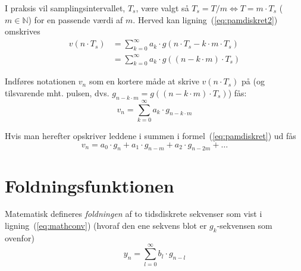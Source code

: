 \documentclass[dvips,11pt,a4paper]{article}
\begin{document}

\noindent{}I praksis vil samplingsintervallet, $T_s$, være valgt så $T_s = T/m \Leftrightarrow{} T = m \cdot T_s$ ($m \in \mathbb{N}$) for en passende værdi af $m$. Herved kan ligning~(\ref{eq:pamdiskret2}) omskrives
\begin{align}
v(n \cdot T_{s}) &= \sum_{k=0}^{\infty} a_{k} \cdot g(n \cdot T_{s}-k \cdot m \cdot T_s) \\
 &= \sum_{k=0}^{\infty} a_{k} \cdot g((n - k \cdot m) \cdot T_{s}) 
\end{align}

\noindent{}Indføres notationen $v_n$ som en kortere måde at skrive $v(n \cdot T_s)$ på (og tilsvarende mht. pulsen, dvs. $g_{n-k\cdot{}m} = g((n - k \cdot m) \cdot T_{s})$) fås:
\begin{equation}
v_n = \sum_{k=0}^{\infty} a_{k} \cdot g_{n - k \cdot m}
\label{eq:pamdiskret}
\end{equation}

\noindent{}Hvis man herefter opskriver leddene i summen i formel~(\ref{eq:pamdiskret}) ud fås
\begin{equation}
v_{n} = a_{0}\cdot{}g_{n} + a_{1}\cdot{}g_{n-m} + a_{2}\cdot{}g_{n-2m} + \ldots{} 
\label{eq:v_n}
\end{equation}

\section{Foldningsfunktionen}
Matematisk defineres {\em foldningen} af to tidsdiskrete sekvenser som vist i ligning~(\ref{eq:mathconv}) (hvoraf den ene sekvens blot er $g_k$-sekvensen som ovenfor)
\begin{equation}
y_n = \sum_{l=0}^{\infty} b_{l} \cdot g_{n-l}
\label{eq:mathconv}
\end{equation}
\end{document}
